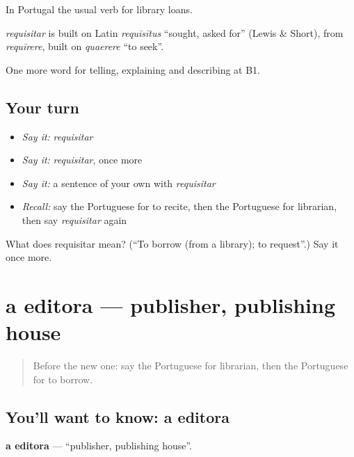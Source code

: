 In Portugal the usual verb for library loans.

\begin{cousinweb}
\emph{requisitar} is built on Latin \emph{requīsītus} \textquotedblleft{}sought, asked for\textquotedblright{} (Lewis \& Short), from \emph{requīrere}, built on \emph{quaerere} \textquotedblleft{}to seek\textquotedblright{}.
\end{cousinweb}

\begin{grammarlens}[title={What you've built}]
One more word for telling, explaining and describing at B1.
\end{grammarlens}

\subsection*{Your turn}
\begin{itemize}
\raggedright
  \item \emph{Say it:} \emph{requisitar}
  \item \emph{Say it:} \emph{requisitar}, once more
  \item \emph{Say it:} a sentence of your own with \emph{requisitar}
  \item \emph{Recall:} say the Portuguese for to recite, then the Portuguese for librarian, then say \emph{requisitar} again
\end{itemize}

\begin{tcolorbox}[breakable,colback=teal!4,colframe=teal!35!black,title={Before you move on}]
What does requisitar mean? (\textquotedblleft{}To borrow (from a library); to request\textquotedblright{}.) Say it once more.
\end{tcolorbox}
\section[a editora]{a editora — publisher, publishing house}

\label{lesson:PT-C525-editora}



\begin{quote}
Before the new one: say the Portuguese for librarian, then the Portuguese for to borrow.
\end{quote}

\subsection*{You'll want to know: a editora}
\textbf{a editora} — \textquotedblleft{}publisher, publishing house\textquotedblright{}.

